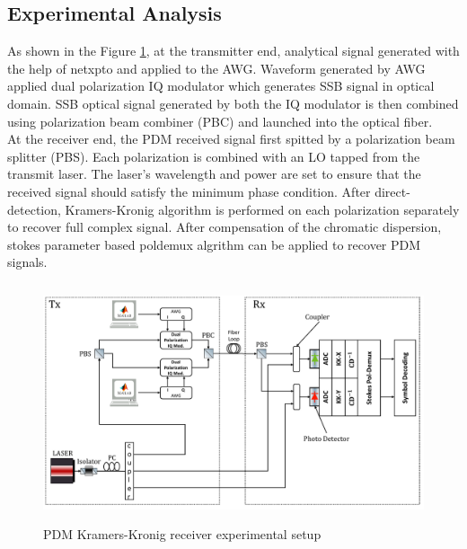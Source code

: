 \subsection{Experimental Analysis}
 As shown in the Figure \ref{Practical_setup_TxRx}, at the transmitter end, analytical signal generated with the help of netxpto and applied to the AWG. Waveform generated by AWG applied dual polarization IQ modulator which generates SSB signal in optical domain. SSB optical signal generated by both the IQ modulator is then combined using polarization beam combiner (PBC) and launched into the optical fiber.\\
 At the receiver end, the PDM received signal first spitted by a polarization beam splitter (PBS). Each polarization is combined with an LO tapped from the transmit laser. The laser's wavelength and power are set to ensure that the received signal should satisfy the minimum phase condition. After direct-detection, Kramers-Kronig algorithm is performed on each polarization separately to recover full complex signal. After compensation of the chromatic dispersion, stokes parameter based poldemux algrithm can be applied to recover PDM signals.     
\begin{figure}[h]
	\centering
	\includegraphics[width=1.0\textwidth, height=7cm]{./sdf/simplified_coherent_receiver/figures/Practical_setup_TxRx.pdf}
	\caption{PDM Kramers-Kronig receiver experimental setup}\label{Practical_setup_TxRx}
\end{figure}

